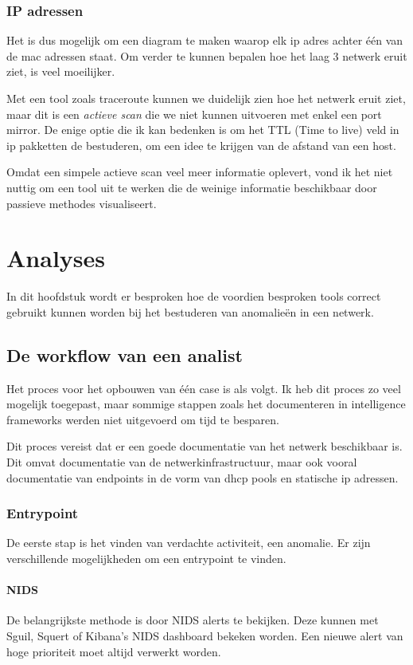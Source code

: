 \documentclass[a4paper,12pt]{report}
\begin{document}
\subsection{IP adressen}
Het is dus mogelijk om een diagram te maken waarop elk ip adres achter één van de mac adressen staat.
Om verder te kunnen bepalen hoe het laag 3 netwerk eruit ziet, is veel moeilijker.

Met een tool zoals traceroute kunnen we duidelijk zien hoe het netwerk eruit ziet, maar dit is een \emph{actieve scan} die we niet kunnen uitvoeren met enkel een port mirror.
De enige optie die ik kan bedenken is om het TTL (Time to live) veld in ip pakketten de bestuderen, om een idee te krijgen van de afstand van een host.

Omdat een simpele actieve scan veel meer informatie oplevert, vond ik het niet nuttig om een tool uit te werken die de weinige informatie beschikbaar door passieve methodes visualiseert.

\chapter{Analyses}
In dit hoofdstuk wordt er besproken hoe de voordien besproken tools correct gebruikt kunnen worden bij het bestuderen van anomalieën in een netwerk.

\section{De workflow van een analist}
Het proces voor het opbouwen van één case is als volgt.
Ik heb dit proces zo veel mogelijk toegepast, maar sommige stappen zoals het documenteren in intelligence frameworks werden niet uitgevoerd om tijd te besparen.

Dit proces vereist dat er een goede documentatie van het netwerk beschikbaar is.
Dit omvat documentatie van de netwerkinfrastructuur, maar ook vooral documentatie van endpoints in de vorm van dhcp pools en statische ip adressen.

\subsection{Entrypoint}
De eerste stap is het vinden van verdachte activiteit, een anomalie.
Er zijn verschillende mogelijkheden om een entrypoint te vinden.

\subsubsection{NIDS}
De belangrijkste methode is door NIDS alerts te bekijken.
Deze kunnen met Sguil, Squert of Kibana's NIDS dashboard bekeken worden.
Een nieuwe alert van hoge prioriteit moet altijd verwerkt worden.
\end{document}
